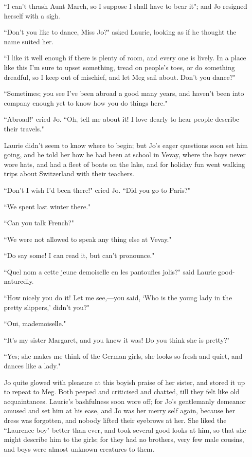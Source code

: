 ``I can't thrash Aunt March, so I suppose I shall have to
bear it"; and Jo resigned herself with a sigh.

``Don't you like to dance, Miss Jo?" asked Laurie,
looking as if he thought the name suited her.

``I like it well enough if there is plenty of room, and every one is
lively. In a place like this I'm sure to upset
something, tread on people's toes, or do something
dreadful, so I keep out of mischief, and let Meg sail about.
Don't you dance?"

``Sometimes; you see I've been abroad a good many years,
and haven't been into company enough yet to know how you
do things here."

``Abroad!" cried Jo. ``Oh, tell me about it! I love dearly to hear people
describe their travels."

Laurie didn't seem to know where to begin; but
Jo's eager questions soon set him going, and he told her
how he had been at school in Vevay, where the boys never wore hats, and
had a fleet of boats on the lake, and for holiday fun went walking trips
about Switzerland with their teachers.

``Don't I wish I'd been there!" cried Jo.
``Did you go to Paris?"

``We spent last winter there."

``Can you talk French?"

``We were not allowed to speak any thing else at Vevay."

``Do say some! I can read it, but can't pronounce."

``Quel nom a cette jeune demoiselle en les pantoufles jolis?" said Laurie
good-naturedly.

``How nicely you do it! Let me see,---you said, `Who is
the young lady in the pretty slippers,'
didn't you?"

``Oui, mademoiselle."

``It's my sister Margaret, and you knew it was! Do you
think she is pretty?"

``Yes; she makes me think of the German girls, she looks so fresh and
quiet, and dances like a lady."

Jo quite glowed with pleasure at this boyish praise of her sister, and
stored it up to repeat to Meg. Both peeped and criticised and chatted,
till they felt like old acquaintances. Laurie's
bashfulness soon wore off; for Jo's gentlemanly demeanor
amused and set him at his ease, and Jo was her merry self again, because
her dress was forgotten, and nobody lifted their eyebrows at her. She
liked the ``Laurence boy" better than ever, and took several good looks
at him, so that she might describe him to the girls; for they had no
brothers, very few male cousins, and boys were almost unknown creatures
to them.

